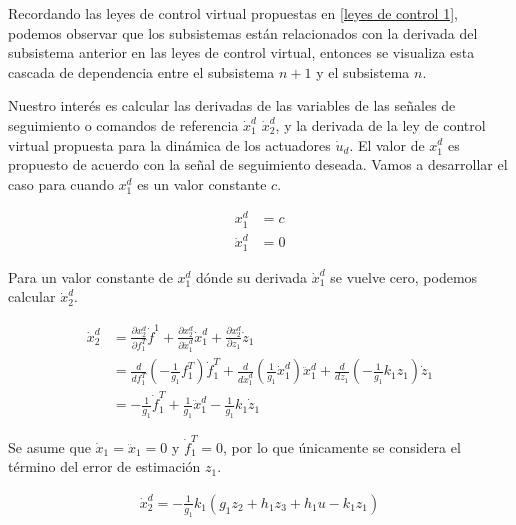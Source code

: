 

\medskip

Recordando las leyes de control virtual propuestas en \ref{leyes de control 1}, podemos observar que los subsistemas están relacionados con la derivada del subsistema anterior en las leyes de control virtual, entonces se visualiza esta cascada de dependencia entre el subsistema $n+1$ y el subsistema $n$.

Nuestro interés es calcular las derivadas de las variables de las señales de seguimiento o comandos de referencia $\dot x_1^d$ $\dot x_2^d$, y la derivada de la ley de control virtual propuesta para la dinámica de los actuadores $\dot u_d$.
El valor de $x_1^d$ es propuesto de acuerdo con la señal de seguimiento deseada.
Vamos a desarrollar el caso para cuando $x_1^d$ es un valor constante $c$.

\begin{align}
    x_1^d &= c \\ \nonumber
    \dot x_1^d &= 0 \nonumber
\end{align}

Para un valor constante de  $x_1^d$ dónde su derivada $\dot x_1^d$ se vuelve cero, podemos calcular $\dot x_2^d$. 

\begin{align}
    \dot x_2^d &= \frac{\partial x_2^d}{\partial f_1^T} \dot f^1 + \frac{ \partial x_2^d}{\partial \ddot x_1^d} \dot x_1^d + \frac{\partial x_2^d}{\partial z_1} \dot z_1 \nonumber \\
    &= \frac{d}{d f_1^T} (-\frac{1}{g_1} f_1^T) \dot f_1^T + \frac{d}{d \dot x_1^d} ( \frac{1}{g_1} \dot x_1^d) \ddot x_1^d + \frac{d}{d z_1} (-\frac{1}{g_1} k_1 z_1) \dot z_1 \nonumber \\
    &= -\frac{1}{g_1} \dot f_1^T + \frac{1}{g_1} \ddot x_1^d - \frac{1}{g_1} k_1 \dot z_1
\end{align}

Se asume que $\dot x_1 = \ddot x_1 = 0$ y $\dot f_1^T = 0$, por lo que únicamente se considera el término del error de estimación $z_1$.

\begin{gather}
\label{derivada control 1}
    \dot x_2^d = -\frac{1}{g_1} k_1 (g_1 z_2 + h_1 z_3 + h_1 u - k_1 z_1) 
\end{gather}

